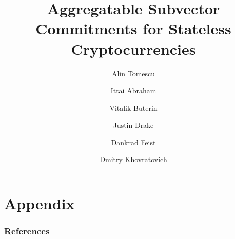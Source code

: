 \documentclass[usenames,dvipsnames,aspectratio=169,10pt]{beamer}
\title[Aggregatable Subvector Commitments for Stateless Cryptocurrencies] %
{Aggregatable Subvector Commitments for Stateless Cryptocurrencies}
\author[Tomescu, Abraham, Buterin, Drake, Feist, Khovratovich] %
{
   Alin Tomescu\inst{1} \and
   Ittai Abraham\inst{1} \and
   Vitalik Buterin\inst{2} \and
   Justin Drake\inst{2} \and
   Dankrad Feist\inst{2} \and
   Dmitry Khovratovich\inst{2}
}
\institute
{
   \inst{1} VMware Research,
   \inst{2} Ethereum Foundation
}
\begin{document}
\frame{\titlepage}





\section{Appendix}
\begin{frame}[allowframebreaks]
    \frametitle{References}
    
    
\end{frame}
\end{document}
